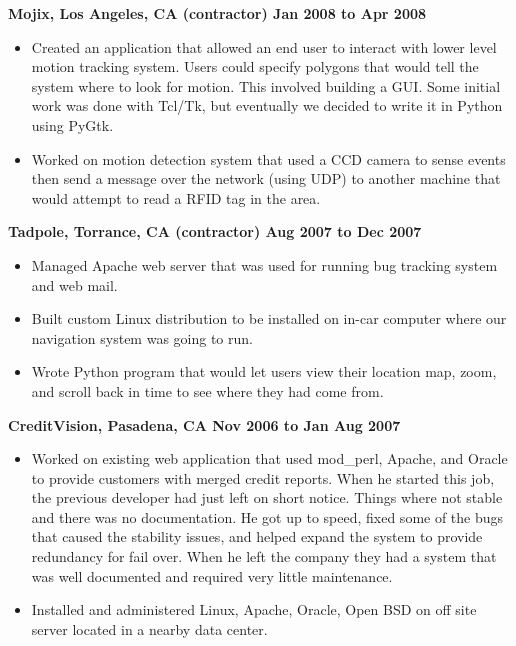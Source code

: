 \documentclass{res}
\begin{document}
\begin{resume}
{\large \bf Mojix, Los Angeles, CA (contractor) \hfill Jan 2008 to Apr 2008}
\begin{itemize}

\item Created an application that allowed an end user to interact
with lower level motion tracking system.  Users could specify polygons
that would tell the system where to look for motion.  This involved
building a GUI.  Some initial work was done with Tcl/Tk, but eventually
we decided to write it in Python using PyGtk.

\item Worked on motion detection system that used a CCD camera to sense
events then send a message over the network (using UDP) to another
machine that would attempt to read a RFID tag in the area.

\end{itemize}

{\large \bf Tadpole, Torrance, CA (contractor) \hfill Aug 2007 to Dec 2007}
\begin{itemize}

\item Managed Apache web server that was used for running bug
tracking system and web mail.

\item Built custom Linux distribution to be installed on in-car
computer where our navigation system was going to run.

\item Wrote Python program that would let users view their location
map, zoom, and scroll back in time to see where they had come from.


\end{itemize}

{\large \bf CreditVision, Pasadena, CA \hfill Nov 2006 to Jan Aug 2007}
\begin{itemize}

\item Worked on existing web application that used mod\_perl, Apache,
and Oracle to provide customers with merged credit reports.  When he
started this job, the previous developer had just left on short notice.
Things where not stable and there was no documentation.  He got up to
speed, fixed some of the bugs that caused the stability issues, and
helped expand the system to provide redundancy for fail over.  When he
left the company they had a system that was well documented and required
very little maintenance.

\item Installed and administered Linux, Apache, Oracle, Open BSD on off
site server located in a nearby data center.


\end{itemize}
\end{resume}
\end{document}
